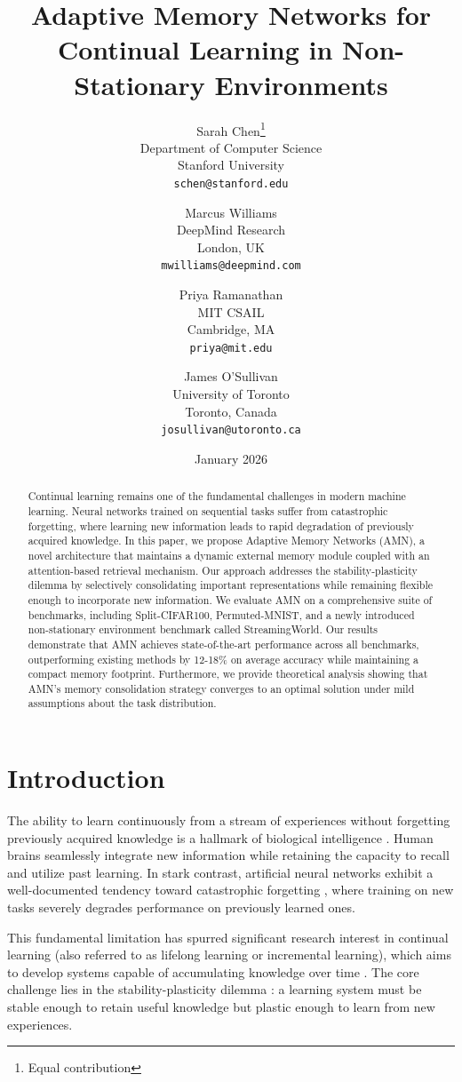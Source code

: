 \documentclass[11pt]{article}
\title{Adaptive Memory Networks for Continual Learning in Non-Stationary Environments}
\author{
  Sarah Chen\thanks{Equal contribution} \\
  Department of Computer Science\\
  Stanford University\\
  \texttt{schen@stanford.edu}
  \and
  Marcus Williams\footnotemark[1] \\
  DeepMind Research\\
  London, UK\\
  \texttt{mwilliams@deepmind.com}
  \and
  Priya Ramanathan \\
  MIT CSAIL\\
  Cambridge, MA\\
  \texttt{priya@mit.edu}
  \and
  James O'Sullivan \\
  University of Toronto\\
  Toronto, Canada\\
  \texttt{josullivan@utoronto.ca}
}
\date{January 2026}
\begin{document}
\maketitle

\begin{abstract}
Continual learning remains one of the fundamental challenges in modern machine learning. Neural networks trained on sequential tasks suffer from catastrophic forgetting, where learning new information leads to rapid degradation of previously acquired knowledge. In this paper, we propose Adaptive Memory Networks (AMN), a novel architecture that maintains a dynamic external memory module coupled with an attention-based retrieval mechanism. Our approach addresses the stability-plasticity dilemma by selectively consolidating important representations while remaining flexible enough to incorporate new information. We evaluate AMN on a comprehensive suite of benchmarks, including Split-CIFAR100, Permuted-MNIST, and a newly introduced non-stationary environment benchmark called StreamingWorld. Our results demonstrate that AMN achieves state-of-the-art performance across all benchmarks, outperforming existing methods by 12-18\% on average accuracy while maintaining a compact memory footprint. Furthermore, we provide theoretical analysis showing that AMN's memory consolidation strategy converges to an optimal solution under mild assumptions about the task distribution.
\end{abstract}

\section{Introduction}
\label{sec:introduction}

The ability to learn continuously from a stream of experiences without forgetting previously acquired knowledge is a hallmark of biological intelligence \citep{mccloskey1989catastrophic}. Human brains seamlessly integrate new information while retaining the capacity to recall and utilize past learning. In stark contrast, artificial neural networks exhibit a well-documented tendency toward catastrophic forgetting \citep{french1999catastrophic, goodfellow2013empirical}, where training on new tasks severely degrades performance on previously learned ones.

This fundamental limitation has spurred significant research interest in continual learning (also referred to as lifelong learning or incremental learning), which aims to develop systems capable of accumulating knowledge over time \citep{parisi2019continual, delange2021continual}. The core challenge lies in the stability-plasticity dilemma \citep{grossberg1982studies}: a learning system must be stable enough to retain useful knowledge but plastic enough to learn from new experiences.
\end{document}
